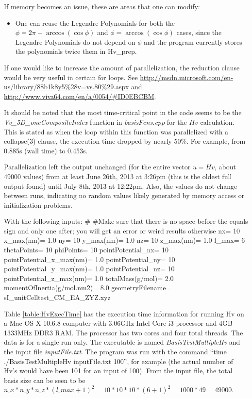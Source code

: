 \documentclass{revtex4-1}
\begin{document}
If memory becomes an issue, these are areas that one can modify:
\begin{itemize}
\item One can reuse the Legendre Polynomials for both the $\phi = 2\pi - \arccos(\cos \phi)$ and $\phi = \arccos(\cos \phi)$ cases, since the Legendre Polynomials do not depend on $\phi$ and the program currently stores the polynomials twice them in Hv\_prep.
\end{itemize}

If one would like to increase the amount of parallelization, the reduction clause would be very useful in certain for loops. See \url{http://msdn.microsoft.com/en-us/library/88b1k8y5%28v=vs.80%29.aspx} and \url{http://www.viva64.com/en/a/0054/#ID0EBCBM}. 

It should be noted that the most time-critical point in the code seems to be the \emph{Vv\_5D\_oneCompositeIndex} function in \emph{basisFcns.cpp} for the $Hv$ calculation. This is stated as when the loop within this function was parallelized with a collapse(3) clause, the execution time dropped by nearly 50\%. For example, from 0.885s (wall time) to 0.453s.

Parallelization left the output unchanged (for the entire vector $u = Hv$, about 49000 values) from at least June 26th, 2013 at 3:26pm (this is the oldest full output found) until July 8th, 2013 at 12:22pm. Also, the values do not change between runs, indicating no random values likely generated by memory access or initialization problems.

With the following inputs: 
\#
\#Make sure that there is no space before the equals sign and only one after; you will get an error or weird results otherwise
nx= 10
x\_max(nm)= 1.0
ny= 10
y\_max(nm)= 1.0
nz= 10
z\_max(nm)= 1.0
l\_max= 6
thetaPoints= 10
phiPoints= 10
pointPotential\_nx= 10
pointPotential\_x\_max(nm)= 1.0
pointPotential\_ny= 10
pointPotential\_y\_max(nm)= 1.0
pointPotential\_nz= 10
pointPotential\_z\_max(nm)= 1.0
totalMass(g/mol)= 2.0
momentOfInertia(g/mol.nm\^2)= 8.0
geometryFilename= sI\_unitCelltest\_CM\_EA\_ZYZ.xyz


Table \ref{table:HvExecTime} has the execution time information for running Hv on a Mac OS X 10.6.8 computer with 3.06GHz Intel Core i3 processor and 4GB 1333MHz DDR3 RAM. The processor has two cores and four total threads. The data is for a single run only. The executable is named \emph{BasisTestMultipleHv} and the input file \emph{inputFile.txt}. The program was run with the command ``time ./BasisTestMultipleHv inputFile.txt 100'', for example (the actual number of Hv's would have been 101 for an input of 100). From the input file, the total basis size can be seen to be $n\_x*n\_y*n\_z*(l\_max+1)^{2}=10*10*10*(6+1)^{2}=1000*49=49000$.
\end{document}
